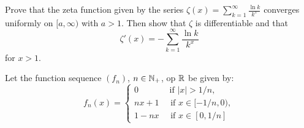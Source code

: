 \documentclass[week=12]{homework}
\date{\today}
\begin{document}
    \maketitle
    \thispagestyle{empty}
    \newpage
    \begin{questions}
		\let\firstquestion\question
		\renewcommand*{\question}{\vspace{7mm}\firstquestion}
        \firstquestion
		Prove that the zeta function given by the series $\zeta(x) = \sum_{k=1}^{\infty} \frac{\ln k}{k^x}$ converges uniformly on $[a,\infty)$ with $a > 1$. Then show that $\zeta$ is differentiable and that 
		\[
			\zeta'(x) = - \sum_{k=1}^{\infty} \frac{\ln k}{k^x}
		\]
		for $x > 1$.
		
		\question
		Let the function sequence $(f_n)$, $n \in \mathbb{N}_+$, op $\mathbb{R}$ be given by:
		\[
			f_n(x) = \begin{cases}
				0 		\qquad \quad \; \text{ if } |x| > 1/n, \\
				nx+1 	\quad \text{ if } x \in [-1/n,0), \\
				1 - nx 	\quad \text{ if } x \in [0,1/n]
			\end{cases}
		\]
		

\end{questions}
\end{document}
